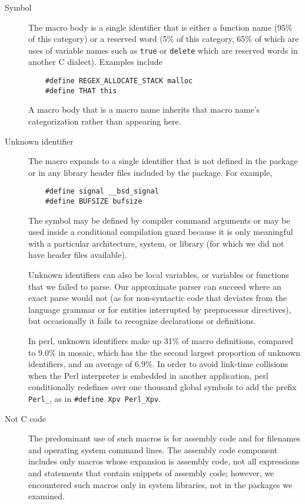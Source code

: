 \documentclass[10pt]{article}
\newcommand{\pkg}[1]{\textsf{#1}}
\begin{document}
\begin{description}
\item[Symbol]
  The macro body is a single identifier that is either a function name
  (95\% of this category) or a reserved word (5\% of this category, 65\% of
  which are uses of variable names such as {\tt true} or {\tt delete} which
  are reserved words in another C dialect).  Examples include
\begin{verbatim}
    #define REGEX_ALLOCATE_STACK malloc
    #define THAT this
\end{verbatim}
  A macro body that is a macro
  name inherits that macro name's categorization rather than appearing
  here.


\item[Unknown identifier]
  The macro expands to a single identifier that is not defined in the package
  or in any library header files included by the package.  For example,
\begin{verbatim}
    #define signal __bsd_signal
    #define BUFSIZE bufsize
\end{verbatim}
  The symbol may
  be defined by compiler command arguments or may be used inside a
  conditional compilation guard because it is only meaningful 
  with a particular architecture, system, or library (for which we did not
  have header files available).

  Unknown identifiers can also be local variables, or variables or
  functions that we failed to
  parse.  Our approximate parser can succeed where an exact parse would not
  (as for non-syntactic code that deviates from the language grammar
  or for entities interrupted by preprocessor
  directives), but occasionally it fails to recognize declarations or
  definitions.
  
  In \pkg{perl}, unknown identifiers make up 31\% of macro definitions,
  compared to 9.0\% in \pkg{mosaic}, which has the the second largest
  proportion of unknown identifiers, and an average of 6.9\%.  In order to
  avoid link-time collisions when the Perl interpreter is embedded in
  another application, \pkg{perl} conditionally redefines over one thousand
  global symbols to add the prefix \verb|Perl_|, as in {\tt \#define Xpv
  \verb|Perl_Xpv|}.


\item[Not C code]\label{page:not-c-code}
  The predominant use of such macros is for assembly code and for filenames
  and operating system command lines.  The assembly code component includes
  only macros whose expansion is assembly code, not all expressions and
  statements that contain snippets of assembly code; however, we
  encountered such macros only in system libraries, not in the packages we
  examined.  
  

\end{description}
\end{document}
